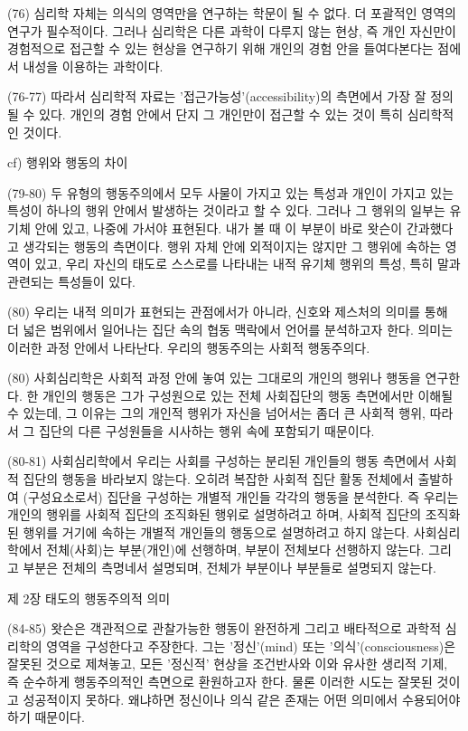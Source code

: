 \documentclass[11pt, a4paper]{article}
\begin{document}
(76) 심리학 자체는 의식의 영역만을 연구하는 학문이 될 수 없다. 더 포괄적인 영역의 연구가 필수적이다. 그러나 심리학은 다른 과학이 다루지 않는 현상, 즉 개인 자신만이 경험적으로 접근할 수 있는 현상을 연구하기 위해 개인의 경험 안을 들여다본다는 점에서 내성을 이용하는 과학이다.

(76-77) 따라서 심리학적 자료는 '접근가능성'(accessibility)의 측면에서 가장 잘 정의될 수 있다. 개인의 경험 안에서 단지 그 개인만이 접근할 수 있는 것이 특히 심리학적인 것이다.

cf) 행위와 행동의 차이

(79-80) 두 유형의 행동주의에서 모두 사물이 가지고 있는 특성과 개인이 가지고 있는 특성이 하나의 행위 안에서 발생하는 것이라고 할 수 있다. 그러나 그 행위의 일부는 유기체 안에 있고, 나중에 가서야 표현된다. 내가 볼 때 이 부분이 바로 왓슨이 간과했다고 생각되는 행동의 측면이다. 행위 자체 안에 외적이지는 않지만 그 행위에 속하는 영역이 있고, 우리 자신의 태도로 스스로를 나타내는 내적 유기체 행위의 특성, 특히 말과 관련되는 특성들이 있다.

(80) 우리는 내적 의미가 표현되는 관점에서가 아니라, 신호와 제스처의 의미를 통해 더 넓은 범위에서 일어나는 집단 속의 협동 맥락에서 언어를 분석하고자 한다. 의미는 이러한 과정 안에서 나타난다. 우리의 행동주의는 사회적 행동주의다.

(80) 사회심리학은 사회적 과정 안에 놓여 있는 그대로의 개인의 행위나 행동을 연구한다. 한 개인의 행동은 그가 구성원으로 있는 전체 사회집단의 행동 측면에서만 이해될 수 있는데, 그 이유는 그의 개인적 행위가 자신을 넘어서는 좀더 큰 사회적 행위, 따라서 그 집단의 다른 구성원들을 시사하는 행위 속에 포함되기 때문이다.

(80-81) 사회심리학에서 우리는 사회를 구성하는 분리된 개인들의 행동 측면에서 사회적 집단의 행동을 바라보지 않는다. 오히려 복잡한 사회적 집단 활동 전체에서 출발하여 (구성요소로서) 집단을 구성하는 개별적 개인들 각각의 행동을 분석한다. 즉 우리는 개인의 행위를 사회적 집단의 조직화된 행위로 설명하려고 하며, 사회적 집단의 조직화된 행위를 거기에 속하는 개별적 개인들의 행동으로 설명하려고 하지 않는다. 사회심리학에서 전체(사회)는 부분(개인)에 선행하며, 부분이 전체보다 선행하지 않는다. 그리고 부분은 전체의 측명네서 설명되며, 전체가 부분이나 부분들로 설명되지 않는다. 


제 2장 태도의 행동주의적 의미

(84-85) 왓슨은 객관적으로 관찰가능한 행동이 완전하게 그리고 배타적으로 과학적 심리학의 영역을 구성한다고 주장한다. 그는 '정신'(mind) 또는 '의식'(consciousness)은 잘못된 것으로 제쳐놓고, 모든 '정신적' 현상을 조건반사와 이와 유사한 생리적 기제, 즉 순수하게 행동주의적인 측면으로 환원하고자 한다. 물론 이러한 시도는 잘못된 것이고 성공적이지 못하다. 왜냐하면 정신이나 의식 같은 존재는 어떤 의미에서 수용되어야 하기 때문이다.
\end{document}
